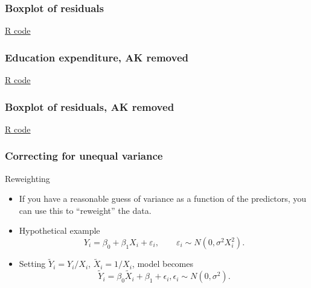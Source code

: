 \documentclass[handout]{beamer}
\begin{document}
   \begin{frame}
   \frametitle{Boxplot of residuals}
   \begin{center}
   \end{center}
   \href{http://stats191.stanford.edu/transformations.html#education-example}{R code}
   \end{frame}



   \begin{frame}
   \frametitle{Education expenditure, AK removed}
   \begin{center}
   \end{center}
   \href{http://stats191.stanford.edu/transformations.html#education-example}{R code}
   \end{frame}



   \begin{frame}
   \frametitle{Boxplot of residuals, AK removed}
   \begin{center}
   \end{center}
   \href{http://stats191.stanford.edu/transformations.html#education-example}{R code}
   \end{frame}


   \begin{frame} \frametitle{Correcting for unequal variance}

   \begin{block}{Reweighting}
   \begin{itemize}


   \item If you have a reasonable guess of variance as a function
   of the predictors, you can use this to ``reweight'' the data.

   \item Hypothetical example
   $$
   Y_i = \beta_0 + \beta_1 X_i + \varepsilon_i, \qquad \varepsilon_i \sim N(0,\sigma^2 X_i^2).$$

   \item Setting $\tilde{Y}_i = Y_i / X_i$, $\tilde{X}_i = 1 / X_i$, model becomes
   $$
   \tilde{Y}_i = \beta_0 \tilde{X}_i + \beta_1 + \epsilon_i, \epsilon_i \sim N(0,\sigma^2).$$
   \end{itemize}
   \end{block}
   \end{frame}
\end{document}
